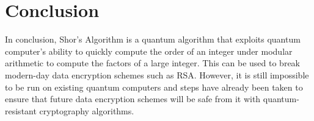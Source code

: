 \documentclass{article}
\begin{document}
\section{Conclusion}

In conclusion, Shor's Algorithm is a quantum algorithm that exploits quantum computer's ability to quickly compute the order of an integer under modular arithmetic to compute the factors of a large integer. This can be used to break modern-day data encryption schemes such as RSA. However, it is still impossible to be run on existing quantum computers and steps have already been taken to ensure that future data encryption schemes will be safe from it with quantum-resistant cryptography algorithms.
\end{document}

